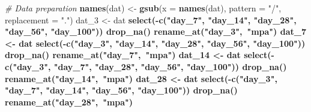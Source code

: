 \documentclass[
]{article}
\newenvironment{Shaded}{\begin{snugshade}}{\end{snugshade}}
\newcommand{\CommentTok}[1]{\textcolor[rgb]{0.56,0.35,0.01}{\textit{#1}}}
\newcommand{\DataTypeTok}[1]{\textcolor[rgb]{0.13,0.29,0.53}{#1}}
\newcommand{\DecValTok}[1]{\textcolor[rgb]{0.00,0.00,0.81}{#1}}
\newcommand{\KeywordTok}[1]{\textcolor[rgb]{0.13,0.29,0.53}{\textbf{#1}}}
\newcommand{\NormalTok}[1]{#1}
\newcommand{\OperatorTok}[1]{\textcolor[rgb]{0.81,0.36,0.00}{\textbf{#1}}}
\newcommand{\StringTok}[1]{\textcolor[rgb]{0.31,0.60,0.02}{#1}}
\begin{document}
\begin{Shaded}
\begin{Highlighting}[]
\CommentTok{# Data preparation}
\KeywordTok{names}\NormalTok{(dat) <-}\StringTok{ }\KeywordTok{gsub}\NormalTok{(}\DataTypeTok{x =} \KeywordTok{names}\NormalTok{(dat), }\DataTypeTok{pattern =} \StringTok{"/"}\NormalTok{, }\DataTypeTok{replacement =} \StringTok{"."}\NormalTok{)  }
\NormalTok{dat_}\DecValTok{3}\NormalTok{ <-}\StringTok{ }\NormalTok{dat }\OperatorTok{%
\StringTok{  }\KeywordTok{select}\NormalTok{(}\OperatorTok{-}\KeywordTok{c}\NormalTok{(}\StringTok{"day_7"}\NormalTok{, }\StringTok{"day_14"}\NormalTok{, }\StringTok{"day_28"}\NormalTok{, }\StringTok{"day_56"}\NormalTok{, }\StringTok{"day_100"}\NormalTok{)) }\OperatorTok{%
\StringTok{  }\KeywordTok{drop_na}\NormalTok{() }\OperatorTok{%
\StringTok{  }\KeywordTok{rename_at}\NormalTok{(}\StringTok{"day_3"}\NormalTok{,}\OperatorTok{~}\StringTok{"mpa"}\NormalTok{)}
\NormalTok{dat_}\DecValTok{7}\NormalTok{ <-}\StringTok{ }\NormalTok{dat }\OperatorTok{%
\StringTok{  }\KeywordTok{select}\NormalTok{(}\OperatorTok{-}\KeywordTok{c}\NormalTok{(}\StringTok{"day_3"}\NormalTok{, }\StringTok{"day_14"}\NormalTok{, }\StringTok{"day_28"}\NormalTok{, }\StringTok{"day_56"}\NormalTok{, }\StringTok{"day_100"}\NormalTok{)) }\OperatorTok{%
\StringTok{  }\KeywordTok{drop_na}\NormalTok{() }\OperatorTok{%
\StringTok{  }\KeywordTok{rename_at}\NormalTok{(}\StringTok{"day_7"}\NormalTok{,}\OperatorTok{~}\StringTok{"mpa"}\NormalTok{)}
\NormalTok{dat_}\DecValTok{14}\NormalTok{ <-}\StringTok{ }\NormalTok{dat }\OperatorTok{%
\StringTok{  }\KeywordTok{select}\NormalTok{(}\OperatorTok{-}\KeywordTok{c}\NormalTok{(}\StringTok{"day_3"}\NormalTok{, }\StringTok{"day_7"}\NormalTok{, }\StringTok{"day_28"}\NormalTok{, }\StringTok{"day_56"}\NormalTok{, }\StringTok{"day_100"}\NormalTok{)) }\OperatorTok{%
\StringTok{  }\KeywordTok{drop_na}\NormalTok{() }\OperatorTok{%
\StringTok{  }\KeywordTok{rename_at}\NormalTok{(}\StringTok{"day_14"}\NormalTok{,}\OperatorTok{~}\StringTok{"mpa"}\NormalTok{)}
\NormalTok{dat_}\DecValTok{28}\NormalTok{ <-}\StringTok{ }\NormalTok{dat }\OperatorTok{%
\StringTok{  }\KeywordTok{select}\NormalTok{(}\OperatorTok{-}\KeywordTok{c}\NormalTok{(}\StringTok{"day_3"}\NormalTok{, }\StringTok{"day_7"}\NormalTok{, }\StringTok{"day_14"}\NormalTok{, }\StringTok{"day_56"}\NormalTok{, }\StringTok{"day_100"}\NormalTok{)) }\OperatorTok{%
\StringTok{  }\KeywordTok{drop_na}\NormalTok{() }\OperatorTok{%
\StringTok{  }\KeywordTok{rename_at}\NormalTok{(}\StringTok{"day_28"}\NormalTok{,}\OperatorTok{~}\StringTok{"mpa"}\NormalTok{)}
}}}}}}}}}}}}
\end{Highlighting}
\end{Shaded}
\end{document}
